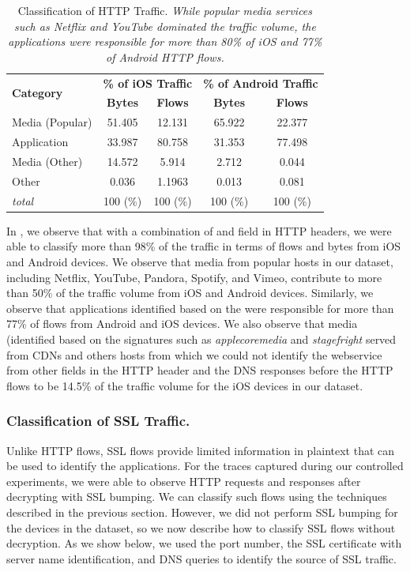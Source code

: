 \begin{table}
\centering
\begin{small}
\begin{tabular}{|p{}|c|c|c|c|}
\hline
\multirow{2}{*}{\bf Category} & \multicolumn{2}{c|}{\bf \% of iOS Traffic } &  \multicolumn{2}{c|}{\bf \% of Android Traffic } \tabularnewline
\cline{2-5}
  & {\bf Bytes}  & {\bf Flows} & {\bf Bytes} & {\bf Flows}   \tabularnewline
\hline
Media (Popular)         & 51.405  & 12.131 & 65.922 & 22.377 \tabularnewline
\hline
Application             & 33.987  & 80.758 & 31.353 & 77.498 \tabularnewline
\hline
Media (Other)           & 14.572  &  5.914 &  2.712 &  0.044 \tabularnewline
\hline
Other                   &  0.036  & 1.1963 &  0.013 &  0.081 \tabularnewline
\hline
{\em total}             & 100 (\%)& 100 (\%)& 100 (\%) & 100 (\%) \tabularnewline
\hline
\end{tabular}
\end{small}
\caption{Classification of HTTP Traffic. \emph{While popular media services such as Netflix and YouTube dominated the traffic volume, the applications were responsible for more than 80\% of iOS and 77\% of Android HTTP flows.}}
\label{tab:classify-http}
\end{table}

In , we observe that with a combination of \useragent and \httphost field in HTTP headers, we were able to classify more than 98\% of the traffic in terms of flows and bytes from iOS and Android devices.
We observe that media from popular hosts in our \mobWild dataset, including Netflix, YouTube, Pandora, Spotify, and Vimeo, contribute to more than 50\% of the traffic volume from iOS and Android devices.
Similarly, we observe that applications identified based on the \useragent  were responsible for more than 77\% of flows from Android and iOS devices. 
We also observe that media (identified based on the signatures such as \emph{applecoremedia} and \emph{stagefright} served from CDNs and others hosts from which we could not identify the webservice from other fields in the HTTP header and the DNS responses before the HTTP flows to be 14.5\% of the traffic volume for the iOS devices in our dataset.

\subsubsection{Classification of SSL Traffic.}

Unlike HTTP flows, SSL flows provide limited information in plaintext that can be used to identify the applications. 
For the traces captured during our controlled experiments, we were able to observe HTTP requests and responses 
after decrypting with SSL bumping. We can classify such flows using the techniques described in the previous section. 
However, we did not perform SSL bumping for the devices in the \mobWild dataset, so we now describe how to 
classify SSL flows without decryption. As we show below, we used the port number, the SSL certificate with server 
name identification, and DNS queries to identify the source of SSL traffic. 

